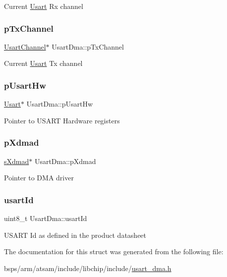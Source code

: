 Current \mbox{\hyperlink{structUsart}{Usart}} Rx channel \mbox{\label{structUsartDma_aca29d09987b0d6cc696588dc695e4341}} 
\subsubsection{\texorpdfstring{pTxChannel}{pTxChannel}}
{\footnotesize\ttfamily \mbox{\hyperlink{structUsartChannel}{Usart\+Channel}}$\ast$ Usart\+Dma\+::p\+Tx\+Channel}

Current \mbox{\hyperlink{structUsart}{Usart}} Tx channel \mbox{\label{structUsartDma_a594f2023773095105867ab77cd0d046d}} 
\subsubsection{\texorpdfstring{pUsartHw}{pUsartHw}}
{\footnotesize\ttfamily \mbox{\hyperlink{structUsart}{Usart}}$\ast$ Usart\+Dma\+::p\+Usart\+Hw}

Pointer to U\+S\+A\+RT Hardware registers \mbox{\label{structUsartDma_a3b74d3a1b9ea6516dc1db7f01e57f320}} 
\subsubsection{\texorpdfstring{pXdmad}{pXdmad}}
{\footnotesize\ttfamily \mbox{\hyperlink{group__dmad__structs_gaf2c13151514615a6beb35c0d868a5053}{s\+Xdmad}}$\ast$ Usart\+Dma\+::p\+Xdmad}

Pointer to D\+MA driver \mbox{\label{structUsartDma_ac4d16295a0ccb49eab67e78c1cdfc9c7}} 
\subsubsection{\texorpdfstring{usartId}{usartId}}
{\footnotesize\ttfamily uint8\+\_\+t Usart\+Dma\+::usart\+Id}

U\+S\+A\+RT Id as defined in the product datasheet 

The documentation for this struct was generated from the following file\+:\begin{DoxyCompactItemize}
\item 
bsps/arm/atsam/include/libchip/include/\mbox{\hyperlink{usart__dma_8h}{usart\+\_\+dma.\+h}}\end{DoxyCompactItemize}
